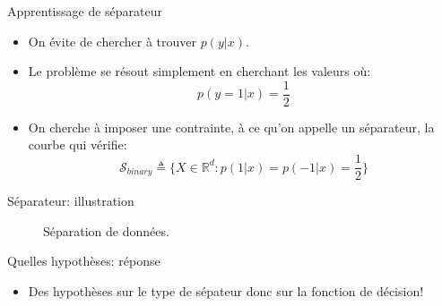 \documentclass[8pt]{beamer}
\begin{document}
		\begin{frame}{Apprentissage de séparateur}
			\begin{itemize}
				\item<1-> On évite de chercher à trouver $p(y\vert x)$.
				\item<2-> Le problème se résout simplement en cherchant les valeurs où:
						\begin{equation*}
							p(y = 1 \vert x) = \frac{1}{2}
						\end{equation*}
				\item  On cherche à imposer une contrainte, à ce qu'on appelle un séparateur, la courbe qui vérifie:
					\begin{equation}
						\mathscr{S}_{binary} \triangleq \{X \in \mathbb{R}^d: p(1\vert x) = p(-1\vert x) = \frac{1}{2} \}
					\end{equation}
			\end{itemize}
		\end{frame}

		\begin{frame}{Séparateur: illustration}
			\begin{figure}[H]
				{
					\caption{\tiny Séparation de données.}
				}
			\end{figure}
		\end{frame}

		\begin{frame}{Quelles hypothèses: réponse}
			\begin{itemize}
				\item<2-> Des hypothèses sur le type de sépateur donc sur la fonction de décision!
			\end{itemize}
		\end{frame}
\end{document}
